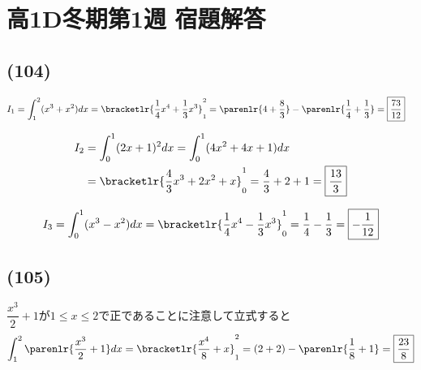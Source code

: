 \documentclass[dvipdfmx,uplatex,b5paper]{jsarticle}
\begin{document}
\section*{高1D冬期第1週 宿題解答}
\subsection*{(104)}
\begin{enumarabicp}
  \item \begin{align*}
    I_1&= \int_1^2 (x^3+x^2)dx 
        = \bracketlr{\frac{1}{4}x^4+\frac{1}{3}x^3}_1^2 
        = \parenlr{4+\frac{8}{3}}-\parenlr{\frac{1}{4}+\frac{1}{3}} 
        = \boxed{\frac{73}{12}}
  \end{align*}

  \item \begin{align*}
    I_2&= \int_0^1 (2x+1)^2dx
       = \int _0^1(4x^2+4x+1)dx \\
       &= \bracketlr{\frac{4}{3}x^3+2x^2+x}_0^1
       = \frac{4}{3}+2+1=\boxed{\frac{13}{3}}
  \end{align*}

  \item \begin{align*}
    I_3 = \int_0^1 (x^3-x^2)dx
        = \bracketlr{\frac{1}{4}x^4-\frac{1}{3}x^3}_0^1
        = \frac{1}{4}-\frac{1}{3} = \boxed{-\frac{1}{12}}
  \end{align*}
\end{enumarabicp}

\subsection*{(105)}
$\dfrac{x^3}{2}+1$が$1\leq x\leq 2$で正であることに注意して立式すると
\begin{align*}
  \int_1^2 \parenlr{\frac{x^3}{2}+1}dx = \bracketlr{\frac{x^4}{8}+x}_1^2
  = (2+2)-\parenlr{\frac{1}{8}+1}= \boxed{\frac{23}{8}}
\end{align*}
\end{document}

